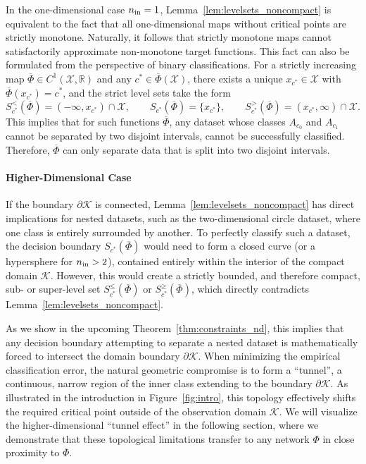 \documentclass[10pt]{article}
\theoremstyle{definition}
\numberwithin{equation}{section}
\newcommand{\R}{\mathbb{R}}
\newcommand*{\nin}{n_\textup{in}}
\begin{document}
In the one-dimensional case $\nin = 1$, Lemma~\ref{lem:levelsets_noncompact} is equivalent to the fact that all one-dimensional maps without critical points are strictly monotone. Naturally, it follows that strictly monotone maps cannot satisfactorily approximate non-monotone target functions. This fact can also be formulated from the perspective of binary classifications. For a strictly increasing map $\overline{\Phi} \in C^1(\mathcal{X},\R)$ and any $c^\ast \in \overline{\Phi}(\mathcal{X})$, there exists a unique $x_{c^\ast} \in \mathcal{X}$ with $\overline{\Phi}(x_{c^\ast}) = c^\ast$, and the strict level sets take the form
\begin{equation}\label{eq:levelsets}
    S_{c^\ast}^{<}(\overline{\Phi}) = (-\infty, x_{c^\ast}) \cap \mathcal{X}, \qquad S_{c^\ast}(\overline{\Phi}) = \{x_{c^\ast}\}, \qquad  S_{c^\ast}^{>}(\overline{\Phi}) = (x_{c^\ast}, \infty) \cap \mathcal{X}.
\end{equation}
This implies that for such functions $\overline{\Phi}$, any dataset whose classes $A_{c_0}$ and $A_{c_1}$ cannot be separated by two disjoint intervals, cannot be successfully classified. Therefore, $\overline{\Phi}$ can only separate data that is split into two disjoint intervals. 

\paragraph{Higher-Dimensional Case}

If the boundary $\partial \mathcal{K}$ is connected, Lemma~\ref{lem:levelsets_noncompact} has direct implications for nested datasets, such as the two-dimensional circle dataset, where one class is entirely surrounded by another. To perfectly classify such a dataset, the decision boundary $S_{c^\ast}(\overline{\Phi})$ would need to form a closed curve (or a hypersphere for $\nin > 2$), contained entirely within the interior of the compact domain $\mathcal{K}$. However, this would create a strictly bounded, and therefore compact, sub- or super-level set $S_{c^\ast}^{\leq}(\overline{\Phi})$ or $S_{c^\ast}^{\geq}(\overline{\Phi})$, which directly contradicts Lemma~\ref{lem:levelsets_noncompact}. 

As we show in the upcoming Theorem~\ref{thm:constraints_nd}, this implies that any decision boundary attempting to separate a nested dataset is mathematically forced to intersect the domain boundary $\partial \mathcal{K}$. When minimizing the empirical classification error, the natural geometric compromise is to form a ``tunnel'', a continuous, narrow region of the inner class extending to the boundary $\partial \mathcal{K}$. As illustrated in the introduction in Figure~\ref{fig:intro}, this topology effectively shifts the required critical point outside of the observation domain $\mathcal{K}$. We will visualize the higher-dimensional ``tunnel effect'' in the following section, where we demonstrate that these topological limitations transfer to any network $\Phi$ in close proximity to $\overline{\Phi}$.
\end{document}
